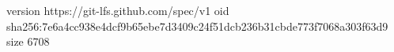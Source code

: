 version https://git-lfs.github.com/spec/v1
oid sha256:7e6a4cc938e4dcf9b65ebe7d3409c24f51dcb236b31cbde773f7068a303f63d9
size 6708
